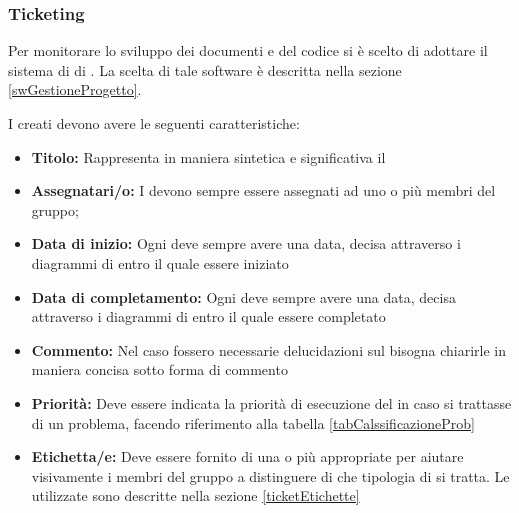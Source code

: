 \documentclass[12pt,a4paper]{article}
\begin{document}
\subsubsection{Ticketing}\label{ticket} %
Per monitorare lo sviluppo dei documenti e del codice si è scelto di adottare il sistema di  di . La scelta di tale software è descritta nella sezione \ref{swGestioneProgetto}.

\label{ticketStruttura}
I  creati devono avere le seguenti caratteristiche:
\begin{itemize}

	\item \textbf{Titolo:} Rappresenta in maniera sintetica e significativa il 
	\item \textbf{Assegnatari/o:} I  devono sempre essere assegnati ad uno o più membri del gruppo;
	\item \textbf{Data di inizio:} Ogni  deve sempre avere una data, decisa attraverso i diagrammi di  entro il quale essere iniziato
	\item \textbf{Data di completamento:} Ogni  deve sempre avere una data, decisa attraverso i diagrammi di  entro il quale essere completato
	\item \textbf{Commento:} Nel caso fossero necessarie delucidazioni sul  bisogna chiarirle in maniera concisa sotto forma di commento
	\item \textbf{Priorità:} Deve essere indicata la priorità di esecuzione del  in caso si trattasse di un problema, facendo riferimento alla tabella \ref{tabCalssificazioneProb}
	\item \textbf{Etichetta/e:} Deve essere fornito di una o più appropriate  per aiutare visivamente i membri del gruppo a distinguere di che tipologia di  si tratta. Le  utilizzate sono descritte nella sezione \ref{ticketEtichette}

\end{itemize}
\end{document}
